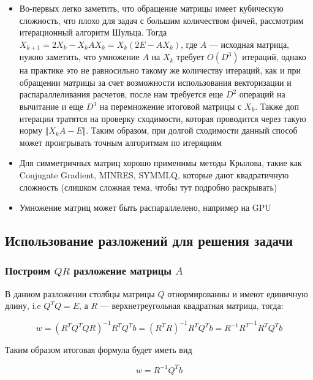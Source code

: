\documentclass{article}
\begin{document}
    \quad

    \begin{itemize}
        \item Во-первых легко заметить, что обращение матрицы имеет кубическую сложность, что плохо для задач с большим количеством фичей, рассмотрим
        итерационный алгоритм Шульца.
        Тогда $X_{k+1} = 2 X_{k} - X_{k} A X_{k} = X_{k} (2E - A X_{k})$, где $A$ --- исходная матрица, нужно заметить, что умножение $A$ на $X_{k}$ требует
        $O(D^{3})$ итераций, однако на практике это не равносильно такому же количеству итераций, как и при обращении матрицы за счет возможности использования
        векторизации и распараллеливания расчетов, после нам требуется еще $D^{2}$ операций на вычитание и еще $D^{3}$ на перемножение итоговой матрицы с $X_{k}$.
        Также доп итерации тратятся на проверку сходимости, которая проводится через такую норму $\Vert X_{k}A - E \Vert$.
        Таким образом, при долгой сходимости данный способ может проигрывать точным алгоритмам по итеряциям
        \item Для симметричных матриц хорошо применимы методы Крылова, такие как Conjugate Gradient,
        MINRES, SYMMLQ, которые дают квадратичную сложность (слишком сложная тема, чтобы тут подробно раскрывать)
        \item Умножение матриц может быть распараллелено, например на GPU
    \end{itemize}


    \subsection{Использование разложений для решения задачи}

    \subsubsection{Построим $QR$ разложение матрицы $A$}

    В данном разложении столбцы матрицы $Q$ отнормированны и имеют единичную длину, i.e $Q^{T}Q = E$, а $R$ --- верхнетреугольная квадратная матрица, тогда:

    \begin{equation}
        w = (R^{T}Q^{T}QR)^{-1} R^{T}Q^{T} b = (R^{T}R)^{-1} R^{T}Q^{T} b = R^{-1} {R^{T}}^{-1} R^{T}Q^{T} b
    \end{equation}

    Таким образом итоговая формула будет иметь вид

    \begin{equation}
        w = R^{-1} Q^{T} b
    \end{equation}
\end{document}
